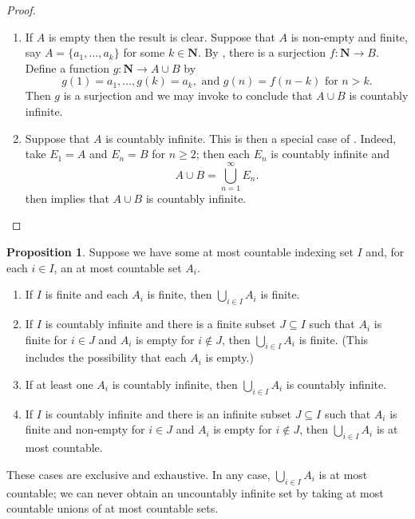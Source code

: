 \documentclass[12pt]{article}
\theoremstyle{definition}
\newtheorem{proposition}[definition]{Proposition}
\newcommand{\N}{\mathbf{N}}
\begin{document}
\begin{proof}
    \begin{enumerate}[label = (\roman*)]
        \item If \( A \) is empty then the result is clear. Suppose that \( A \) is non-empty and finite, say \( A = \{ a_1, \ldots, a_k \} \) for some \( k \in \N \). By , there is a surjection \( f : \N \to B \). Define a function \( g : \N \to A \cup B \) by
        \[
            g(1) = a_1, \ldots, g(k) = a_k, \text{ and  } g(n) = f(n - k) \text{ for } n > k.
        \]
        Then \( g \) is a surjection and we may invoke  to conclude that \( A \cup B \) is countably infinite.

        \item Suppose that \( A \) is countably infinite. This is then a special case of . Indeed, take \( E_1 = A \) and \( E_n = B \) for \( n \geq 2 \); then each \( E_n \) is countably infinite and
        \[
            A \cup B = \bigcup_{n=1}^{\infty} E_n.
        \]
         then implies that \( A \cup B \) is countably infinite. \qedhere
    \end{enumerate}
\end{proof}

\begin{proposition}
\label{prop:amc_union_of_amc_sets_is_amc}
    Suppose we have some at most countable indexing set \( I \) and, for each \( i \in I \), an at most countable set \( A_i \).
    \begin{enumerate}[label = (\roman*)]
        \item If \( I \) is finite and each \( A_i \) is finite, then \( \bigcup_{i \in I} A_i \) is finite.
        
        \item If \( I \) is countably infinite and there is a finite subset \( J \subseteq I \) such that \( A_i \) is finite for \( i \in J \) and \( A_i \) is empty for \( i \not\in J \), then \( \bigcup_{i \in I} A_i \) is finite. (This includes the possibility that each \( A_i \) is empty.)
        
        \item If at least one \( A_i \) is countably infinite, then \( \bigcup_{i \in I} A_i \) is countably infinite.

        \item If \( I \) is countably infinite and there is an infinite subset \( J \subseteq I \) such that \( A_i \) is finite and non-empty for \( i \in J \) and \( A_i \) is empty for \( i \not\in J \), then \( \bigcup_{i \in I} A_i \) is at most countable.
    \end{enumerate}
    These cases are exclusive and exhaustive. In any case, \( \bigcup_{i \in I} A_i \) is at most countable; we can never obtain an uncountably infinite set by taking at most countable unions of at most countable sets.
\end{proposition}
\end{document}
